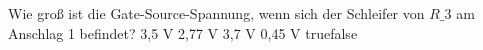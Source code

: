     {Wie groß ist die Gate-Source-Spannung, wenn sich der Schleifer von $R\_3$ am Anschlag 1 befindet?}
    {3,5 V}
    {2,77 V}
    {3,7 V}
    {0,45 V}
    {true}{false}